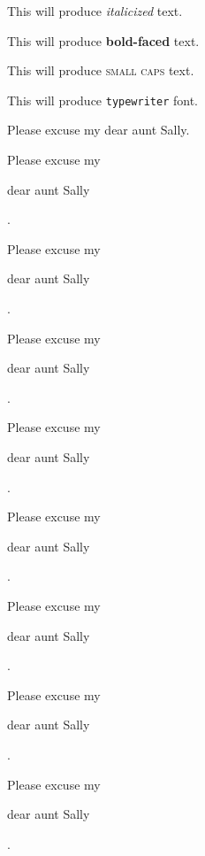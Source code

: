 \documentclass[12pt]{article}
\begin{document}
This will produce \textit{italicized} text.

This will produce \textbf{bold-faced} text.

This will produce \textsc{small caps} text.

This will produce \texttt{typewriter} font.

Please excuse my dear aunt Sally.

Please excuse my \begin{large}dear aunt Sally\end{large}. 

Please excuse my \begin{Large}dear aunt Sally\end{Large}. 

Please excuse my \begin{huge}dear aunt Sally\end{huge}. 

Please excuse my \begin{Huge}dear aunt Sally\end{Huge}. 

Please excuse my \begin{small}dear aunt Sally\end{small}. 

Please excuse my \begin{footnotesize}dear aunt Sally\end{footnotesize}. 

Please excuse my \begin{scriptsize}dear aunt Sally\end{scriptsize}. 

Please excuse my \begin{tiny}dear aunt Sally\end{tiny}. 
\end{document}

